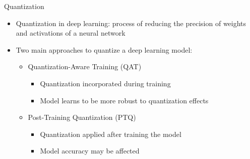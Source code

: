 \documentclass{beamer}
\begin{document}
\begin{frame}{Quantization}
  \begin{itemize}
    \item Quantization in deep learning: process of reducing the precision of weights and activations of a neural network
    \item Two main approaches to quantize a deep learning model:
    \begin{itemize}
      \item Quantization-Aware Training (QAT)
      \begin{itemize}
        \item Quantization incorporated during training
        \item Model learns to be more robust to quantization effects
      \end{itemize}
      \item Post-Training Quantization (PTQ)
      \begin{itemize}
        \item Quantization applied after training the model
        \item Model accuracy may be affected
      \end{itemize}
    \end{itemize}
  \end{itemize}
\end{frame}
\end{document}
